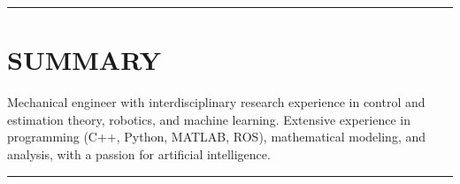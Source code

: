 \documentclass{res}
\begin{document}
\address{evangravelle@gmail.com $\cdot$ (805) 205-4318 $\cdot$ github/evangravelle}

 
\begin{resume}

%
%

 \vspace*{-2ex}
\hspace{-8.5ex}\rule{16.5cm}{0.4pt}
 \vspace*{-3ex}
\section{SUMMARY}
\vspace{1ex}
Mechanical engineer with interdisciplinary research experience in control and estimation theory, robotics, and machine learning. Extensive experience in programming (C++, Python, MATLAB, ROS), mathematical modeling, and analysis, with a passion for artificial intelligence. 

\vspace*{-3ex}
\hspace{-8.5ex}\rule{16.5cm}{0.4pt}
 \vspace*{-3ex}

\end{resume}
\end{document}
